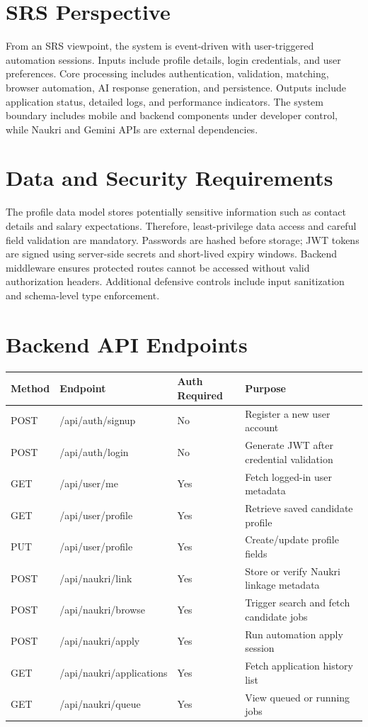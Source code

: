 \documentclass[12pt,a4paper,oneside]{report}
\begin{document}
\section{SRS Perspective}
From an SRS viewpoint, the system is event-driven with user-triggered automation sessions. Inputs include profile details, login credentials, and user preferences. Core processing includes authentication, validation, matching, browser automation, AI response generation, and persistence. Outputs include application status, detailed logs, and performance indicators. The system boundary includes mobile and backend components under developer control, while Naukri and Gemini APIs are external dependencies.

\section{Data and Security Requirements}
The profile data model stores potentially sensitive information such as contact details and salary expectations. Therefore, least-privilege data access and careful field validation are mandatory. Passwords are hashed before storage; JWT tokens are signed using server-side secrets and short-lived expiry windows. Backend middleware ensures protected routes cannot be accessed without valid authorization headers. Additional defensive controls include input sanitization and schema-level type enforcement.

\section{Backend API Endpoints}
\begin{longtable}{p{}p{}p{}p{}}
\toprule
Method & Endpoint & Auth Required & Purpose \\
\midrule
POST & /api/auth/signup & No & Register a new user account \\
POST & /api/auth/login & No & Generate JWT after credential validation \\
GET & /api/user/me & Yes & Fetch logged-in user metadata \\
GET & /api/user/profile & Yes & Retrieve saved candidate profile \\
PUT & /api/user/profile & Yes & Create/update profile fields \\
POST & /api/naukri/link & Yes & Store or verify Naukri linkage metadata \\
POST & /api/naukri/browse & Yes & Trigger search and fetch candidate jobs \\
POST & /api/naukri/apply & Yes & Run automation apply session \\
GET & /api/naukri/applications & Yes & Fetch application history list \\
GET & /api/naukri/queue & Yes & View queued or running jobs \\
\bottomrule
\end{longtable}
\end{document}
